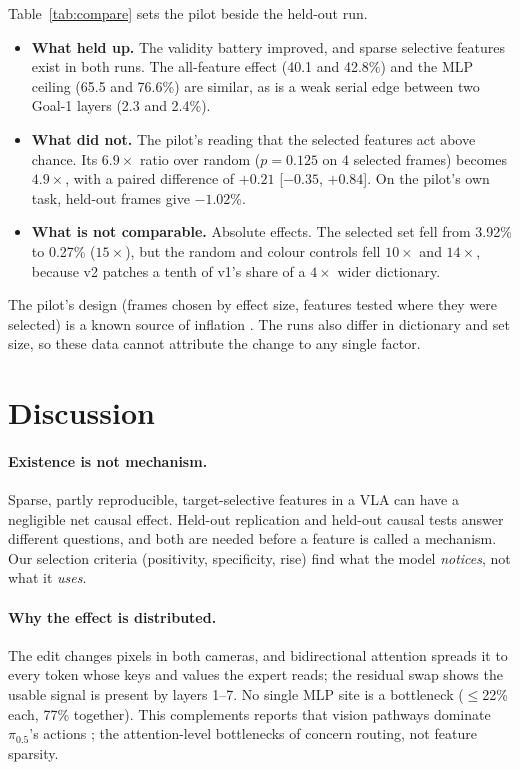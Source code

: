 \documentclass{article} %
\newcommand{\pifive}{$\pi_{0.5}$}
\begin{document}
Table~\ref{tab:compare} sets the pilot beside the held-out run.
\begin{itemize}[leftmargin=*,itemsep=1pt,topsep=2pt]
  \item \textbf{What held up.} The validity battery improved, and sparse selective features exist in both runs. The all-feature effect (40.1 and 42.8\%) and the MLP ceiling (65.5 and 76.6\%) are similar, as is a weak serial edge between two Goal-1 layers (2.3 and 2.4\%).
  \item \textbf{What did not.} The pilot's reading that the selected features act above chance. Its $6.9\times$ ratio over random ($p{=}0.125$ on 4 selected frames) becomes $4.9\times$, with a paired difference of $+0.21$ [$-0.35$, $+0.84$]. On the pilot's own task, held-out frames give $-1.02$\%.
  \item \textbf{What is not comparable.} Absolute effects. The selected set fell from 3.92\% to 0.27\% ($15\times$), but the random and colour controls fell $10\times$ and $14\times$, because v2 patches a tenth of v1's share of a $4\times$ wider dictionary.
\end{itemize}
The pilot's design (frames chosen by effect size, features tested where they were selected) is a known source of inflation \citep{kriegeskorte2009circular}. The runs also differ in dictionary and set size, so these data cannot attribute the change to any single factor.

\section{Discussion}
\label{sec:discussion}
\paragraph{Existence is not mechanism.} Sparse, partly reproducible, target-selective features in a VLA can have a negligible net causal effect. Held-out replication and held-out causal tests answer different questions, and both are needed before a feature is called a mechanism. Our selection criteria (positivity, specificity, rise) find what the model \emph{notices}, not what it \emph{uses}.

\paragraph{Why the effect is distributed.} The edit changes pixels in both cameras, and bidirectional attention spreads it to every token whose keys and values the expert reads; the residual swap shows the usable signal is present by layers 1--7. No single MLP site is a bottleneck ($\le$22\% each, 77\% together). This complements reports that vision pathways dominate \pifive{}'s actions \citep{grant2026features}; the attention-level bottlenecks of \citet{shi2026vlatrace} concern routing, not feature sparsity.
\end{document}
